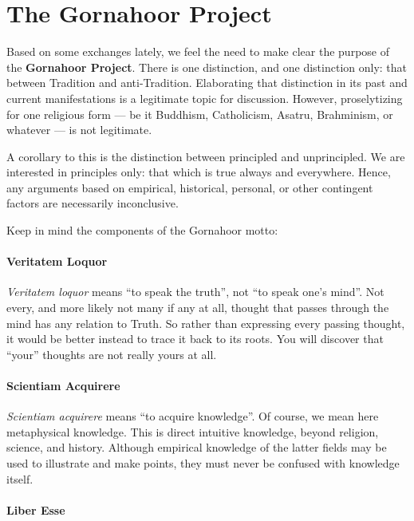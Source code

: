 \section{The Gornahoor Project}

Based on some exchanges lately, we feel the need to make clear the purpose of the \textbf{Gornahoor Project}. There is one distinction, and one distinction only: that between Tradition and anti-Tradition. Elaborating that distinction in its past and current manifestations is a legitimate topic for discussion. However, proselytizing for one religious form --- be it Buddhism, Catholicism, Asatru, Brahminism, or whatever --- is not legitimate.

A corollary to this is the distinction between principled and unprincipled. We are interested in principles only: that which is true always and everywhere. Hence, any arguments based on empirical, historical, personal, or other contingent factors are necessarily inconclusive.

Keep in mind the components of the Gornahoor motto:

\paragraph{Veritatem Loquor}


\emph{Veritatem loquor} means ``to speak the truth'', not ``to speak one's mind''. Not every, and more likely not many if any at all, thought that passes through the mind has any relation to Truth. So rather than expressing every passing thought, it would be better instead to trace it back to its roots. You will discover that ``your'' thoughts are not really yours at all.

\paragraph{Scientiam Acquirere}


\emph{Scientiam acquirere} means ``to acquire knowledge''. Of course, we mean here metaphysical knowledge. This is direct intuitive knowledge, beyond religion, science, and history. Although empirical knowledge of the latter fields may be used to illustrate and make points, they must never be confused with knowledge itself.

\paragraph{Liber Esse}


